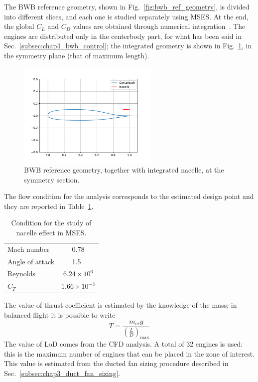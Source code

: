 The BWB reference geometry, shown in Fig.~\ref{fig:bwb_ref_geometry}, is divided into different slices, and each one is studied separately using MSES. 
At the end, the global $C_L$ and $C_D$ values are obtained through numerical integration~\cite{bib:rodriguez_1999}.
The engines are distributed only in the centerbody part, for what has been said in Sec.~\ref{subsec:chap4_bwb_control}; the integrated geometry is shown in Fig.~\ref{fig:bwb_nacelle_geom}, in the symmetry plane (that of maximum length).
\begin{figure}[!h]
	\centering
	\includegraphics[keepaspectratio, width=0.6\textwidth]{images/chap4/bwb_nacelle_geom}
	\caption{BWB reference geometry, together with integrated nacelle, at the symmetry section.}
	\label{fig:bwb_nacelle_geom}
\end{figure}

The flow condition for the analysis corresponds to the estimated design point and they are reported in Table~\ref{tab:mses_flow_condition}.
\begin{table}[!h]
	\centering
	\begin{tabular}{l c}
		\hline
		Mach number & 0.78 \\
		Angle of attack & 1.5~\si{\deg} \\
		Reynolds & $6.24\times10^6$ \\
		$C_T$ & $1.66\times10^{-3}$ \\
		\hline
	\end{tabular}
	\caption{Condition for the study of nacelle effect in MSES.}
	\label{tab:mses_flow_condition}
\end{table}
The value of thrust coefficient is estimated by the knowledge of the mass; in balanced flight it is possible to write
\begin{equation}
	\label{eq:thrust_balanced_flight}
	T = \frac{m_{cr}g}{\left(\frac{L}{D}\right)_{\max}}
\end{equation}
The value of LoD comes from the CFD analysis. 
A total of 32 engines is used: this is the maximum number of engines that can be placed in the zone of interest.
This value is estimated from the ducted fan sizing procedure described in Sec.~\ref{subsec:chap3_duct_fan_sizing}.

